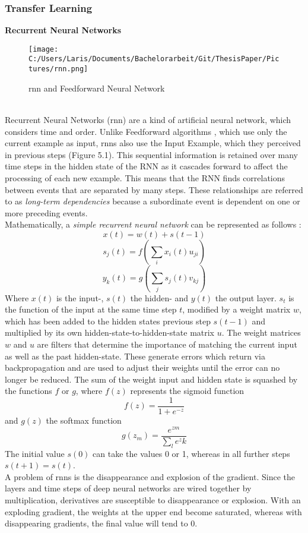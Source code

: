 \documentclass[a4paper, 11pt,titlepage,oneside,openany]{book}
\begin{document}
\subsubsection{Transfer Learning}
\textbf{Recurrent Neural Networks}
\begin{figure}[h]
	\centering
	\texttt{[image: C:/Users/Laris/Documents/Bachelorarbeit/Git/ThesisPaper/Pictures/rnn.png]}
	\caption{\gls{rnn} and Feedforward Neural Network \cite{rnn}}
\end{figure}\\
Recurrent Neural Networks (\gls{rnn}) are a kind of artificial neural network, which considers time and order. Unlike Feedforward algorithms \cite{feedforward}, which use only the current example as input, \gls{rnn}s also use the Input Example, which they perceived in previous steps (Figure 5.1). 
This sequential information is retained over many time steps in the hidden state of the RNN as it cascades forward to affect the processing of each new example. This means that the RNN finds correlations between events that are separated by many steps. These relationships are referred to as \textit{long-term dependencies} because a subordinate event is dependent on one or more preceding events.\\
\newpage
\noindent Mathematically, a \textit{simple recurrent neural network} \cite{ELMAN1990179} can be represented as follows \cite{rnnmodel}:
\[
x(t)=w(t)+s(t-1)
\]
\[
s_j(t)=f(\sum_{i}x_i(t)u_{ji})
\]
\[
y_k(t)=g(\sum_{j}s_j(t)v_{kj})
\]
Where $x(t)$ is the input-, $s(t)$ the hidden- and $y(t)$ the output layer. $s_t$ is the function of the input at the same time step $t$, modified by a weight matrix $w$, which has been added to the hidden states previous step $s(t-1)$ and multiplied by its own hidden-state-to-hidden-state matrix $u$. The weight matrices $w$ and $u$ are filters that determine the importance of matching the current input as well as the past hidden-state. These generate errors which return via backpropagation and are used to adjust their weights until the error can no longer be reduced. The sum of the weight input and hidden state is squashed by the functions $f$ or $g$, where  $f(z)$ represents the sigmoid function
\[
f(z)=\frac{1}{1+e^{-z}}
\]
and $g(z)$ the softmax function
\[
g(z_m)=\frac{e^{zm}}{\sum_{l}e^zk}
\]
The initial value $s(0)$ can take the values 0 or 1, whereas in all further steps $s(t+1)=s(t)$. \\
\noindent A problem of \gls{rnn}s is the disappearance and explosion of the gradient. Since the layers and time steps of deep neural networks are wired together by multiplication, derivatives are susceptible to disappearance or explosion. With an exploding gradient, the weights at the upper end become saturated, whereas with disappearing gradients, the final value will tend to 0. \\
\end{document}
